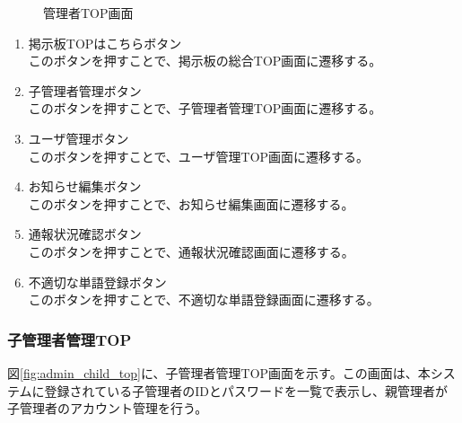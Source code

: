 \documentclass[a4j]{jarticle}
\begin{document}
\begin{figure}[H]
\centering
{}
\caption{管理者TOP画面}
\label{fig:admin_top}
\end{figure}
\begin{enumerate}
  \renewcommand{\labelenumi}{\textcircled{\scriptsize \theenumi}}

\item 掲示板TOPはこちらボタン\\
このボタンを押すことで、掲示板の総合TOP画面に遷移する。

\item 子管理者管理ボタン\\
このボタンを押すことで、子管理者管理TOP画面に遷移する。

\item ユーザ管理ボタン\\
このボタンを押すことで、ユーザ管理TOP画面に遷移する。

\item お知らせ編集ボタン\\
このボタンを押すことで、お知らせ編集画面に遷移する。

\item 通報状況確認ボタン\\
このボタンを押すことで、通報状況確認画面に遷移する。

\item 不適切な単語登録ボタン\\
このボタンを押すことで、不適切な単語登録画面に遷移する。
\end{enumerate}

\subsubsection{子管理者管理TOP}
図\ref{fig:admin_child_top}に、子管理者管理TOP画面を示す。この画面は、本システムに登録されている子管理者のIDとパスワードを一覧で表示し、親管理者が子管理者のアカウント管理を行う。
\end{document}

